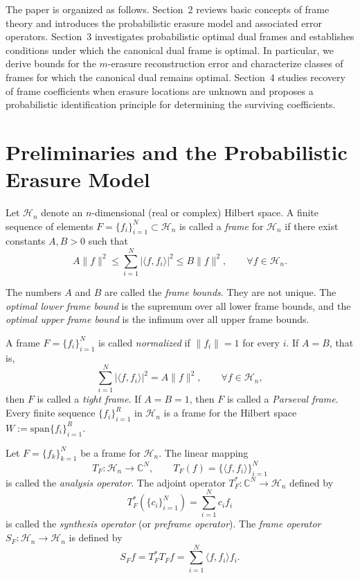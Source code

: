 \documentclass[final,1p,times]{elsarticle}
\begin{document}
The paper is organized as follows. Section~2 reviews basic concepts of frame theory and introduces the probabilistic erasure model and associated error operators. Section~3 investigates probabilistic optimal dual frames and establishes conditions under which the canonical dual frame is optimal. In particular, we derive bounds for the $m$-erasure reconstruction error and characterize classes of frames for which the canonical dual remains optimal. Section~4 studies recovery of frame coefficients when erasure locations are unknown and proposes a probabilistic identification principle for determining the surviving coefficients.

\section{Preliminaries and the Probabilistic Erasure Model}

Let $\mathcal{H}_n$ denote an $n$-dimensional (real or complex) Hilbert space. 
A finite sequence of elements $F=\{f_i\}_{i=1}^N \subset \mathcal{H}_n$ is called a \textit{frame} for $\mathcal{H}_n$ if there exist constants $A,B>0$ such that
\[
A\|f\|^2 \leq \sum_{i=1}^N |\langle f,f_i\rangle|^2 \leq B\|f\|^2,
\qquad \forall f\in \mathcal{H}_n .
\]

The numbers $A$ and $B$ are called the \textit{frame bounds}. They are not unique. 
The \textit{optimal lower frame bound} is the supremum over all lower frame bounds, and the \textit{optimal upper frame bound} is the infimum over all upper frame bounds.

A frame $F=\{f_i\}_{i=1}^N$ is called \textit{normalized} if $\|f_i\|=1$ for every $i$. 
If $A=B$, that is,
\[
\sum_{i=1}^N |\langle f,f_i\rangle|^2 = A\|f\|^2, \qquad \forall f\in \mathcal{H}_n,
\]
then $F$ is called a \textit{tight frame}. If $A=B=1$, then $F$ is called a \textit{Parseval frame}. Every finite sequence $\{f_i\}_{i=1}^R$ in $\mathcal{H}_n$ is a frame for the Hilbert space $W := \mathrm{span}\{f_i\}_{i=1}^R .$

Let $F=\{f_k\}_{k=1}^N$ be a frame for $\mathcal{H}_n$. The linear mapping 
\[
T_F : \mathcal{H}_n \rightarrow \mathbb{C}^N, \qquad 
T_F(f)=\{\langle f,f_i\rangle\}_{i=1}^N
\]
is called the \textit{analysis operator}.  The adjoint operator $T_F^* : \mathbb{C}^N \rightarrow \mathcal{H}_n$ defined by
\[
T_F^*\left(\{c_i\}_{i=1}^N\right)=\sum_{i=1}^N c_i f_i
\]
is called the \textit{synthesis operator} (or \textit{preframe operator}). The \textit{frame operator} $S_F : \mathcal{H}_n \to \mathcal{H}_n$ is defined by
\[
S_F f = T_F^*T_F f = \sum_{i=1}^N \langle f,f_i\rangle f_i .
\]
\end{document}
